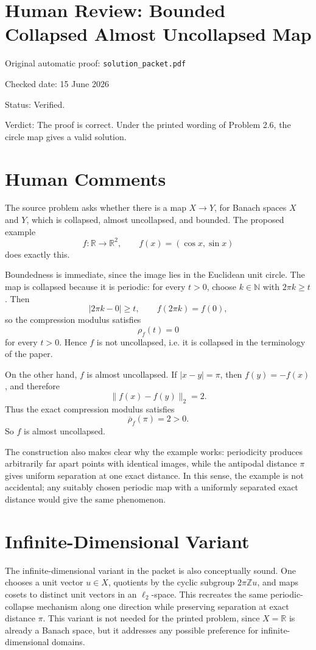 \documentclass[11pt]{article}
\begin{document}
\section*{Human Review: Bounded Collapsed Almost Uncollapsed Map}

\noindent Original automatic proof: \texttt{solution\_packet.pdf}

\noindent Checked date: 15 June 2026

\noindent Status: Verified.

\noindent Verdict: The proof is correct. Under the printed wording of Problem 2.6, the circle map gives a valid solution.

\section*{Human Comments}

The source problem asks whether there is a map \(X\to Y\), for Banach spaces \(X\) and \(Y\), which is collapsed, almost uncollapsed, and bounded. The proposed example
\[
f:\mathbb R\to\mathbb R^2,\qquad f(x)=(\cos x,\sin x)
\]
does exactly this.

Boundedness is immediate, since the image lies in the Euclidean unit circle. The map is collapsed because it is periodic: for every \(t>0\), choose \(k\in\mathbb N\) with \(2\pi k\geq t\). Then
\[
|2\pi k-0|\geq t,\qquad f(2\pi k)=f(0),
\]
so the compression modulus satisfies
\[
\rho_f(t)=0
\]
for every \(t>0\). Hence \(f\) is not uncollapsed, i.e. it is collapsed in the terminology of the paper.

On the other hand, \(f\) is almost uncollapsed. If \(|x-y|=\pi\), then \(f(y)=-f(x)\), and therefore
\[
\|f(x)-f(y)\|_2=2.
\]
Thus the exact compression modulus satisfies
\[
\overline{\rho}_f(\pi)=2>0.
\]
So \(f\) is almost uncollapsed.

The construction also makes clear why the example works: periodicity produces arbitrarily far apart points with identical images, while the antipodal distance \(\pi\) gives uniform separation at one exact distance. In this sense, the example is not accidental; any suitably chosen periodic map with a uniformly separated exact distance would give the same phenomenon.

\section*{Infinite-Dimensional Variant}

The infinite-dimensional variant in the packet is also conceptually sound. One chooses a unit vector \(u\in X\), quotients by the cyclic subgroup \(2\pi\mathbb Z u\), and maps cosets to distinct unit vectors in an \(\ell_2\)-space. This recreates the same periodic-collapse mechanism along one direction while preserving separation at exact distance \(\pi\). This variant is not needed for the printed problem, since \(X=\mathbb R\) is already a Banach space, but it addresses any possible preference for infinite-dimensional domains.
\end{document}
